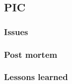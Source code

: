 
\subsection{PIC}
\label{sec:site:pic}

\subsubsection{Issues}
\label{sec:site:pic:Issues}

\subsubsection{Post mortem}
\label{sec:site:pic:postmortem}

\subsubsection{Lessons learned}
\label{sec:site:pic:lessons}
